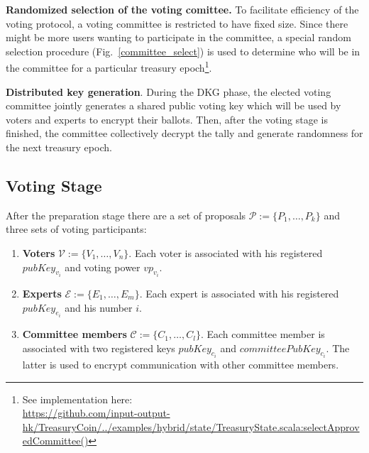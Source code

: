 \textbf{Randomized selection of the voting comittee.} To facilitate efficiency of the voting protocol, a voting committee is restricted to have fixed size. Since there might be more users wanting to participate in the committee, a special random selection procedure (Fig.~\ref{committee_select}) is used to determine who will be in the committee for a particular treasury epoch\footnote{See implementation here:\\ \href{https://github.com/input-output-hk/TreasuryCoin/blob/master/examples/src/main/scala/examples/hybrid/state/TreasuryState.scala\#L367}{https://github.com/input-output-hk/TreasuryCoin/../examples/hybrid/state/TreasuryState.scala:selectApprovedCommittee()}}.


\textbf{Distributed key generation}. During the DKG phase, the elected voting committee jointly generates a shared public voting key which will be used by voters and experts to encrypt their ballots. Then, after the voting stage is finished, the committee collectively decrypt the tally and generate randomness for the next treasury epoch.

\subsection{Voting Stage}
After the preparation stage there are a set of proposals $\mathcal{P}:=\{P_1,\ldots, P_k \}$ and three sets of voting participants:
\begin{enumerate}
    \item \textbf{Voters} $\mathcal{V}:=\{V_1,\ldots, V_n \}$. Each voter is associated with his registered $pubKey_{v_i}$ and voting power $vp_{v_i}$.
    \item \textbf{Experts} $\mathcal{E}:=\{E_1,\ldots, E_m \}$. Each expert is associated with his registered $pubKey_{e_i}$ and his number $i$. 
    \item \textbf{Committee members} $\mathcal{C}:=\{C_1,\ldots, C_l \}$. Each committee member is associated with two registered keys $pubKey_{c_i}$ and $committeePubKey_{c_i}$. The latter is used to encrypt communication with other committee members.
\end{enumerate}

